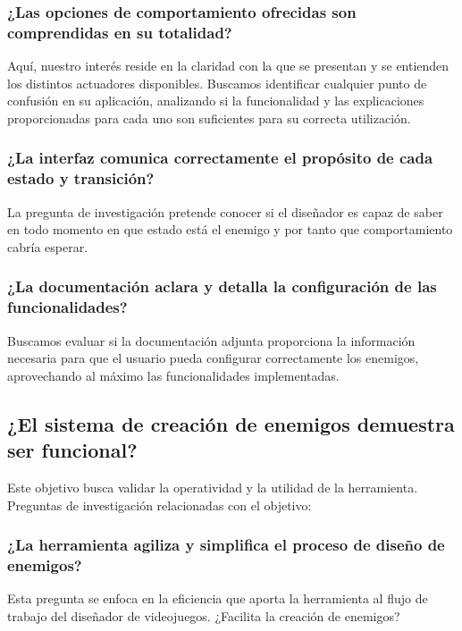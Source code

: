 \subsubsection{¿Las opciones de comportamiento ofrecidas son comprendidas en su totalidad?}
Aquí, nuestro interés reside en la claridad con la que se presentan y se entienden los distintos actuadores disponibles. Buscamos identificar cualquier punto de confusión en su aplicación, analizando si la funcionalidad y las explicaciones proporcionadas para cada uno son suficientes para su correcta utilización.\\

\subsubsection{¿La interfaz comunica correctamente el propósito de cada estado y transición?}
La pregunta de investigación pretende conocer si el diseñador es capaz de saber en todo momento en que estado está el enemigo y por tanto que comportamiento cabría esperar.\\

\subsubsection{¿La documentación aclara y detalla la configuración de las funcionalidades?}
Buscamos evaluar si la documentación adjunta proporciona la información necesaria para que el usuario pueda configurar correctamente los enemigos, aprovechando al máximo las funcionalidades implementadas. \\

\subsection{¿El sistema de creación de enemigos demuestra ser funcional?}
Este objetivo busca validar la operatividad y la utilidad de la herramienta.\\

Preguntas de investigación relacionadas con el objetivo:
\subsubsection{¿La herramienta agiliza y simplifica el proceso de diseño de enemigos?}
Esta pregunta se enfoca en la eficiencia que aporta la herramienta al flujo de trabajo del diseñador de videojuegos. ¿Facilita la creación de enemigos?\\

